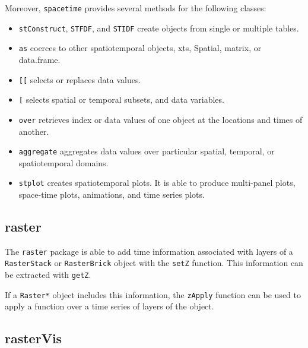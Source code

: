 \documentclass[smallroyalvopaper]{memoir}
\begin{document}
Moreover, \texttt{spacetime} provides several methods for the following classes:

\begin{itemize}
\item \texttt{stConstruct}, \texttt{STFDF}, and \texttt{STIDF} create objects from single or multiple tables.

\item \texttt{as} coerces to other spatiotemporal objects, xts, Spatial, matrix, or data.frame.

\item \texttt{[[} selects or replaces data values.

\item \texttt{[} selects spatial or temporal subsets, and data variables.

\item \texttt{over} retrieves index or data values of one object at the locations and times of another.

\item \texttt{aggregate} aggregates data values over particular spatial, temporal, or spatiotemporal domains.

\item \texttt{stplot} creates spatiotemporal plots. It is able to produce multi-panel plots, space-time plots, animations, and time series plots.
\end{itemize}

\subsection{raster}
\label{sec:orgheadline39}
\label{sec:rasterST}

The \texttt{raster} package \cite{Hijmans2013} is able to add time information associated with layers of a \texttt{RasterStack} or \texttt{RasterBrick} object with the \texttt{setZ} function. This information can be extracted with \texttt{getZ}.

If a \texttt{Raster*} object includes this information, the \texttt{zApply} function can be used to apply a function over a time series of layers of the object.

\subsection{rasterVis}
\label{sec:orgheadline40}
\label{sec:rastervisST}
\end{document}
